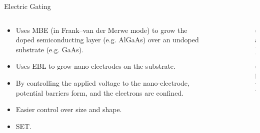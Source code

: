 \documentclass{beamer}
\begin{document}

            


\begin{frame}{Electric Gating}
    \begin{columns}
        \begin{column}{0.6\textwidth}
            \begin{itemize}
                \item Uses MBE (in Frank–van der Merwe mode) to grow the doped semiconducting layer (e.g. AlGaAs) over an undoped substrate (e.g. GaAs).
                \item Uses EBL to grow nano-electrodes on the substrate.
                \item By controlling the applied voltage to the nano-electrode, potential barriers form, and the electrons are confined.
                \item Easier control over size and shape.
                \item SET.
            \end{itemize}
        \end{column}

        \begin{column}{0.4\textwidth}
            \begin{figure}
                \centering
                \begin{subfigure}
                    \texttt{[image: E\_Gating.png]}(a)
                \end{subfigure}

                \begin{subfigure}
                    \texttt{[image: SET.png]}(b)
                \end{subfigure}
                \caption{}
                \label{Egating and SET}
            \end{figure}
        \end{column}
    \end{columns}
\end{frame}
\end{document}

